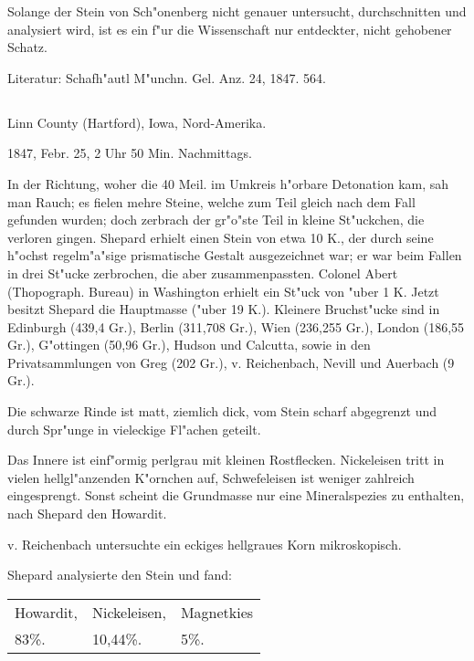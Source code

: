 \documentclass[a4paper, 11pt, oneside]{article}
\begin{document}
Solange der Stein von Sch"onenberg nicht genauer untersucht, durchschnitten und analysiert wird, ist es ein f"ur die Wissenschaft nur entdeckter, nicht gehobener Schatz.

\normalsize
Literatur: Schafh"autl M"unchn. Gel. Anz. 24, 1847. 564.

\subsection{}
\LARGE
\paragraph{}
Linn County (Hartford), Iowa, Nord-Amerika.

1847, Febr. 25, 2 Uhr 50 Min. Nachmittags.

In der Richtung, woher die 40 Meil. im Umkreis h"orbare Detonation kam, sah man Rauch; es fielen mehre Steine, welche zum Teil gleich nach dem Fall gefunden wurden; doch zerbrach der gr"o"ste Teil in kleine St"uckchen, die verloren gingen. Shepard erhielt einen Stein von etwa 10 K., der durch seine h"ochst regelm"a"sige prismatische Gestalt ausgezeichnet war; er war beim Fallen in drei St"ucke zerbrochen, die aber zusammenpassten. Colonel Abert (Thopograph. Bureau) in Washington erhielt ein St"uck von "uber 1 K. Jetzt besitzt Shepard die Hauptmasse ("uber 19 K.). Kleinere Bruchst"ucke sind in Edinburgh (439,4 Gr.), Berlin (311,708 Gr.), Wien (236,255 Gr.), London (186,55 Gr.), G"ottingen (50,96 Gr.), Hudson und Calcutta, sowie in den Privatsammlungen von Greg (202 Gr.), v. Reichenbach, Nevill und Auerbach (9 Gr.).

Die schwarze Rinde ist matt, ziemlich dick, vom Stein scharf abgegrenzt und durch Spr"unge in vieleckige Fl"achen geteilt.

Das Innere ist einf"ormig perlgrau mit kleinen Rostflecken. Nickeleisen tritt in vielen hellgl"anzenden K"ornchen auf, Schwefeleisen ist weniger zahlreich eingesprengt. Sonst scheint die Grundmasse nur eine Mineralspezies zu enthalten, nach Shepard den Howardit.

v. Reichenbach untersuchte ein eckiges hellgraues Korn mikroskopisch.

Shepard analysierte den Stein und fand:
\begin{table}[H]
    \centering\swabfamily\Large
    \begin{tabular}{l l l}
        Howardit, & Nickeleisen, & Magnetkies \\
        83\%. & 10,44\%. & 5\%. \\
    \end{tabular}
\end{table}
\end{document}
